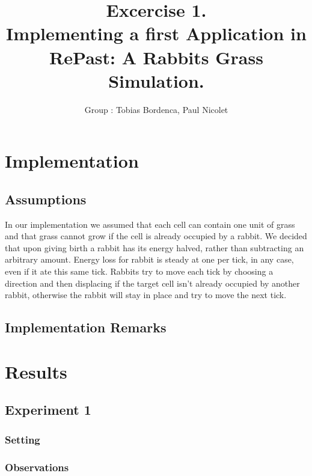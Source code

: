 \documentclass[11pt]{article}
\title{\bf Excercise 1.\\ Implementing a first Application in RePast: A Rabbits Grass Simulation.}
\author{Group \textnumero 1: Tobias Bordenca, Paul Nicolet}
\begin{document}
\maketitle

\section{Implementation}

\subsection{Assumptions}
In our implementation we assumed that each cell can contain one unit of grass and that grass cannot grow if the cell is already occupied by a rabbit. We decided that upon giving birth a rabbit has its energy halved, rather than subtracting an arbitrary amount. Energy loss for rabbit is steady at one per tick, in any case, even if it ate this same tick. Rabbits try to move each tick by choosing a direction and then displacing if the target cell isn't already occupied by another rabbit, otherwise the rabbit will stay in place and try to move the next tick.

\subsection{Implementation Remarks}

\section{Results}

\subsection{Experiment 1}

\subsubsection{Setting}

\subsubsection{Observations}
\end{document}
